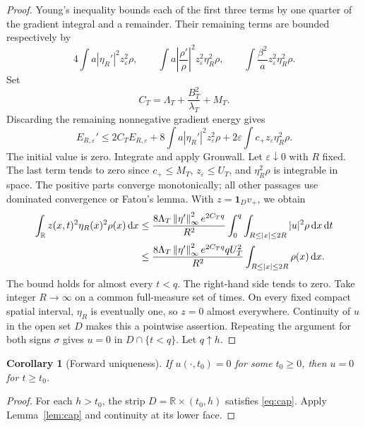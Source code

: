\documentclass[11pt,reqno]{amsart}
\numberwithin{equation}{section}
\newtheorem{corollary}[theorem]{Corollary}
\theoremstyle{definition}
\theoremstyle{remark}
\newcommand{\R}{\mathbb R}
\newcommand{\dd}{\,\mathrm d}
\newcommand{\norm}[1]{\left\lVert#1\right\rVert}
\newcommand{\ind}{\mathbf 1}
\begin{document}
\begin{proof}
Young's inequality bounds each of the first three terms by one quarter of the gradient integral and a remainder. Their remaining terms are bounded respectively by
\[
 4\int a|\eta_R'|^2z_\varepsilon^2\rho,
 \qquad
 \int a\left|\frac{\rho'}{\rho}\right|^2z_\varepsilon^2\eta_R^2\rho,
 \qquad
 \int\frac{\beta^2}{a}z_\varepsilon^2\eta_R^2\rho.
\]
Set
\[
 C_T=\Lambda_T+\frac{B_T^2}{\lambda_T}+M_T.
\]
Discarding the remaining nonnegative gradient energy gives
\begin{equation}\label{eq:gronwallenergy}
 E_{R,\varepsilon}'\leq2C_TE_{R,\varepsilon}
 +8\int a|\eta_R'|^2z_\varepsilon^2\rho
 +2\varepsilon\int c_+z_\varepsilon\eta_R^2\rho.
\end{equation}
The initial value is zero. Integrate and apply Gronwall. Let $\varepsilon\downarrow0$ with $R$ fixed. The last term tends to zero since $c_+\leq M_T$,
$z_\varepsilon\leq U_T$, and $\eta_R^2\rho$ is integrable in space. The positive parts converge monotonically; all other passages use dominated convergence or Fatou's lemma. With $z=\ind_Dv_+$, we obtain
\begin{align}
 \int_\R z(x,t)^2\eta_R(x)^2\rho(x)\dd x
 &\leq \frac{8\Lambda_T\norm{\eta'}_\infty^2e^{2C_Tq}}{R^2}
 \int_0^q\int_{R\leq|x|\leq2R}|u|^2\rho\dd x\dd t\notag\\
 &\leq \frac{8\Lambda_T\norm{\eta'}_\infty^2e^{2C_Tq}qU_T^2}{R^2}
 \int_{R\leq|x|\leq2R}\rho(x)\dd x.
 \label{eq:capannulus}
\end{align}
The bound holds for almost every $t<q$. The right-hand side tends to zero. Take integer $R\to\infty$ on a common full-measure set of times. On every fixed compact spatial interval, $\eta_R$ is eventually one, so $z=0$ almost everywhere. Continuity of $u$ in the open set $D$ makes this a pointwise assertion. Repeating the argument for both signs $\sigma$ gives $u=0$ in $D\cap\{t<q\}$. Let $q\uparrow h$.
\end{proof}

\begin{corollary}[Forward uniqueness]\label{cor:forward}
If $u(\cdot,t_0)=0$ for some $t_0\geq0$, then $u=0$ for $t\geq t_0$.
\end{corollary}
\begin{proof}
For each $h>t_0$, the strip $D=\R\times(t_0,h)$ satisfies \eqref{eq:cap}. Apply Lemma~\ref{lem:cap} and continuity at its lower face.
\end{proof}
\end{document}
